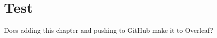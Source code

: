 \documentclass[
12pt,
a4paper,
twoside
]{report}
\begin{document}
\thispagestyle{empty}

%

\parindent=0pt          %
\parskip=5pt            %

% 



\begin{abstract}
	
\end{abstract}








\tableofcontents
\listoftables
\listoffigures









\chapter{Test}
Does adding this chapter and pushing to GitHub make it to Overleaf? 





\appendix

% 
% 
\nocite{*}

\end{document}
